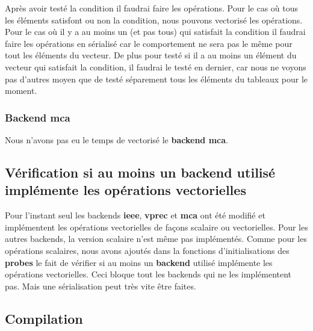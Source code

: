 \documentclass[11pt]{article}
\begin{document}
\vspace{5mm}
Après avoir testé la condition il faudrai faire les opérations. Pour le cas
où tous les éléments satisfont ou non la condition, nous pouvons vectorisé
les opérations. Pour le cas où il y a au moins un (et pas tous) qui
satisfait la condition il faudrai faire les opérations en sérialisé car le
comportement ne sera pas le même pour tout les éléments du vecteur.
\vspace{5mm}
De plus pour testé si il a au moins un élément du vecteur qui satisfait la
condition, il faudrai le testé en dernier, car nous ne voyons pas d'autres
moyen que de testé séparement tous les éléments du tableaux pour le moment.

\subsubsection{Backend mca}
\label{sec:org2146b71}

Nous n'avons pas eu le temps de vectorisé le \textbf{backend mca}.

\subsection{Vérification si au moins un backend utilisé implémente les opérations vectorielles}
\label{sec:orgc5bc772}

Pour l'instant seul les backends \textbf{ieee}, \textbf{vprec} et \textbf{mca} ont été
modifié et implémentent les opérations vectorielles de façons
scalaire ou vectorielles.
\vspace{5mm}
Pour les autres backends, la version scalaire n'est même pas
implémentés.
\vspace{5mm}
Comme pour les opérations scalaires, nous avons ajoutés dans la
fonctions d'initialisations des \textbf{probes} le fait de vérifier si au
moins un \textbf{backend} utilisé implémente les opérations vectorielles.
\vspace{5mm}
Ceci bloque tout les backends qui ne les implémentent pas. Mais une
sérialisation peut très vite être faites.
\subsection{Compilation}
\label{sec:org4d6a33b}
\end{document}
